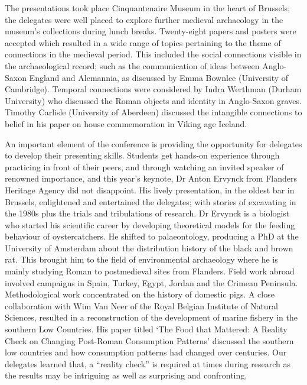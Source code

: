 \documentclass[%
	]{ijsra}
\begin{document}
The presentations took place Cinquantenaire Museum in the heart of Brussels; the delegates were well placed to explore further medieval archaeology in the museum’s collections during lunch breaks. Twenty-eight papers and posters were accepted which resulted in a wide range of topics pertaining to the theme of connections in the medieval period. This included the social connections visible in the archaeological record; such as the communication of ideas between Anglo-Saxon England and Alemannia, as discussed by Emma Bownlee (University of Cambridge). Temporal connections were considered by Indra Werthman (Durham University) who discussed the Roman objects and identity in Anglo-Saxon graves. Timothy Carlisle (University of Aberdeen) discussed the intangible connections to belief in his paper on house commemoration in Viking age Iceland. 

An important element of the conference is providing the opportunity for delegates to develop their presenting skills. Students get hands-on experience through practicing in front of their peers, and through watching an invited speaker of renowned importance, and this year’s keynote, Dr Anton Ervynck from Flanders Heritage Agency did not disappoint. His lively presentation, in the oldest bar in Brussels, enlightened and entertained the delegates; with stories of excavating in the 1980s plus the trials and tribulations of research. Dr Ervynck is a biologist who started his scientific career by developing theoretical models for the feeding behaviour of oystercatchers. He shifted to palaeontology, producing a PhD at the University of Amsterdam about the distribution history of the black and brown rat. This brought him to the field of environmental archaeology where he is mainly studying Roman to postmedieval sites from Flanders. Field work abroad involved campaigns in Spain, Turkey, Egypt, Jordan and the Crimean Peninsula. Methodological work concentrated on the history of domestic pigs. A close collaboration with Wim Van Neer of the Royal Belgian Institute of Natural Sciences, resulted in a reconstruction of the development of marine fishery in the southern Low Countries. His paper titled ‘The Food that Mattered: A Reality Check on Changing Post-Roman Consumption Patterns’ discussed the southern low countries and how consumption patterns had changed over centuries. Our delegates learned that, a “reality check” is required at times during research as the results may be intriguing as well as surprising and confronting. 
\end{document}
